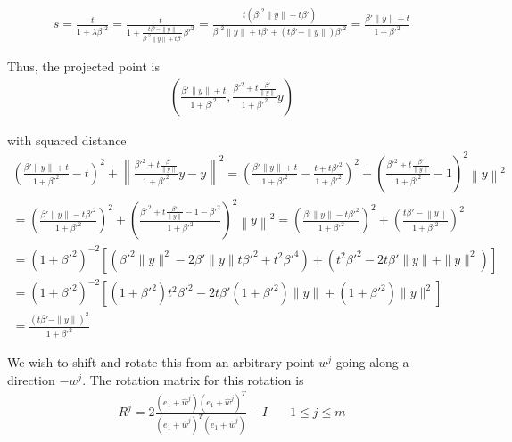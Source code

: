 \documentclass{article}
\theoremstyle{case}
\begin{document}
\begin{align*}
s = \frac {t}{1 + \lambda{\beta'}^2 } 
= \frac {t}{1 +\frac{t{\beta'} - \|y\|}{{\beta'}^2\|y\| + t{\beta'}}{\beta'}^2 } 
= \frac {t\left({\beta'}^2\|y\| + t{\beta'}\right)}{{\beta'}^2\|y\| + t{\beta'} + \left(t{\beta'} - \|y\|\right){\beta'}^2 } 
= \frac {{\beta'}\|y\| + t}{1 + {\beta'}^2 } 
\end{align*}


Thus, the projected point is
\begin{align*}
\left(\frac{{\beta'} \|y\| + t}{1 + {\beta'} ^ 2}, \frac{{\beta'} ^ 2 + t \frac {{\beta'}}{\|y\|}}{1 + {\beta'} ^ 2}y\right)
\end{align*}

with squared distance
\begin{align*}
\left(\frac{{\beta'} \|y\| + t}{1 + {\beta'} ^ 2} - t\right)^2 + \left\|\frac{{\beta'} ^ 2 + t \frac {{\beta'}}{\|y\|}}{1 + {\beta'} ^ 2}y - y\right\|^2
= \left(\frac{{\beta'} \|y\| + t}{1 + {\beta'} ^ 2} - \frac{t + t{\beta'} ^ 2}{1 + {\beta'} ^ 2}\right)^2 + \left(\frac{{\beta'} ^ 2 + t \frac {{\beta'}}{\|y\|}}{1 + {\beta'} ^ 2} - 1\right)^2\left\|y\right\|^2 \\
= \left(\frac{{\beta'} \|y\| - t{\beta'}^2}{1 + {\beta'} ^ 2}\right)^2 + \left(\frac{{\beta'} ^ 2 + t \frac {{\beta'}}{\|y\|} - 1 - {\beta'} ^ 2}{1 + {\beta'} ^ 2}\right)^2\left\|y\right\|^2 
= \left(\frac{{\beta'} \|y\| - t{\beta'}^2}{1 + {\beta'} ^ 2}\right)^2 + \left(\frac{t {\beta'} - \left\|y\right\|}{1 + {\beta'} ^ 2}\right)^2 \\
= \left(1 + {\beta'}^2\right)^{-2}\left[\left({\beta'}^2 \|y\|^2 - 2\beta' \|y\| t {\beta'}^2  + t^2 {\beta'}^4\right) + \left(t^2{\beta'}^2 - 2 t {\beta'} \|y\| + \|y\|^2\right) \right] \\
= \left(1 + {\beta'}^2\right)^{-2}\left[
\left(1 + {\beta'}^2\right)t^2{\beta'}^2 - 2t{\beta'}\left(1 + {\beta'}^2\right) \|y\| + \left(1 + {\beta'}^2\right)\|y\|^2
\right] \\
= \frac{\left(t \beta' - \|y\|\right)^2}{1 + {\beta'}^2}
\end{align*}

We wish to shift and rotate this from an arbitrary point $w^j$ going along a direction $-w^j$.
The rotation matrix for this rotation is 
\begin{align*}
R^j = 2 \frac{(e_1 + \hat w^j)(e_1 + \hat w^j)^T}{(e_1 + \hat w^j)^T(e_1 + \hat w^j)} - I  & \quad 1 \le j \le m \\
\end{align*}
\end{document}
